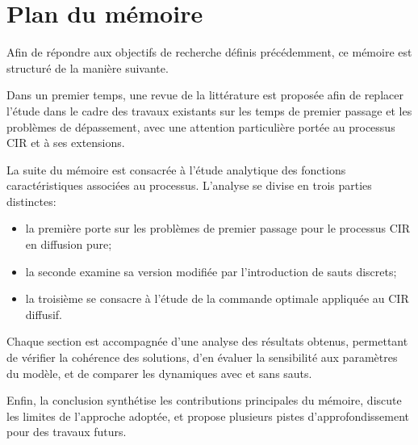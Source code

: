 \section{Plan du mémoire}  %
Afin de répondre aux objectifs de recherche définis précédemment, ce mémoire est structuré de la manière suivante.

Dans un premier temps, une revue de la littérature est proposée afin de replacer l'étude dans le cadre des travaux existants sur les temps de premier passage et les problèmes de dépassement, avec une attention particulière portée au processus \acs{CIR} et à ses extensions.

La suite du mémoire est consacrée à l'étude analytique des fonctions caractéristiques associées au processus. L'analyse se divise en trois parties distinctes: 
\begin{itemize}
    \item la première porte sur les problèmes de premier passage pour le processus \acs{CIR} en diffusion pure;
    \item la seconde examine sa version modifiée par l'introduction de sauts discrets;
    \item la troisième se consacre à l'étude de la commande optimale appliquée au \acs{CIR} diffusif.
\end{itemize}

Chaque section est accompagnée d'une analyse des résultats obtenus, permettant de vérifier la cohérence des solutions, d'en évaluer la sensibilité aux paramètres du modèle, et de comparer les dynamiques avec et sans sauts.

Enfin, la conclusion synthétise les contributions principales du mémoire, discute les limites de l'approche adoptée, et propose plusieurs pistes d'approfondissement pour des travaux futurs.

